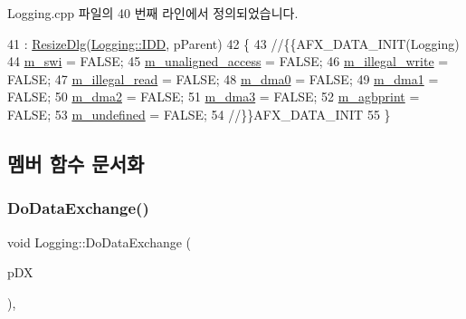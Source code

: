 Logging.\+cpp 파일의 40 번째 라인에서 정의되었습니다.


\begin{DoxyCode}
41   : \mbox{\hyperlink{class_resize_dlg_a87bab778e9312f274ebe750d4c3a67ee}{ResizeDlg}}(\mbox{\hyperlink{class_logging_a6590c79913651cd5b099a01eb6159affa8a7892ae8d4e892222e161f5ff522a9e}{Logging::IDD}}, pParent)
42 \{
43   \textcolor{comment}{//\{\{AFX\_DATA\_INIT(Logging)}
44   \mbox{\hyperlink{class_logging_abd4d213306cb311e8ae4ebdeebb02855}{m\_swi}} = FALSE;
45   \mbox{\hyperlink{class_logging_a7d30e53c3d12b78d9db8627a39fa9d4e}{m\_unaligned\_access}} = FALSE;
46   \mbox{\hyperlink{class_logging_a423cc3cbd5f9b710e696fdfb9ef4ec4b}{m\_illegal\_write}} = FALSE;
47   \mbox{\hyperlink{class_logging_a3b4a194ce51579e42841f4773510cb7d}{m\_illegal\_read}} = FALSE;
48   \mbox{\hyperlink{class_logging_ab0e3d418460cc5c8d699fd8c321463a2}{m\_dma0}} = FALSE;
49   \mbox{\hyperlink{class_logging_a7c8a00ceb6cc33b59daff89a3b509ab6}{m\_dma1}} = FALSE;
50   \mbox{\hyperlink{class_logging_a55074d40fb891df86bda48f59568b1e6}{m\_dma2}} = FALSE;
51   \mbox{\hyperlink{class_logging_aa540b301bc08f1302beb83ff574d89c4}{m\_dma3}} = FALSE;
52   \mbox{\hyperlink{class_logging_a1d79a280aa882918585c08f3e0c2b747}{m\_agbprint}} = FALSE;
53   \mbox{\hyperlink{class_logging_a622f9b082c10c8195c5faa7a8577d520}{m\_undefined}} = FALSE;
54   \textcolor{comment}{//\}\}AFX\_DATA\_INIT}
55 \}
\end{DoxyCode}


\subsection{멤버 함수 문서화}
\mbox{\label{class_logging_acae1b2006158246fdb01652ef474b35e}} 
\subsubsection{\texorpdfstring{Do\+Data\+Exchange()}{DoDataExchange()}}
{\footnotesize\ttfamily void Logging\+::\+Do\+Data\+Exchange (\begin{DoxyParamCaption}\item[{C\+Data\+Exchange $\ast$}]{p\+DX }\end{DoxyParamCaption})\hspace{0.3cm}{\ttfamily [protected]}, {\ttfamily [virtual]}}




